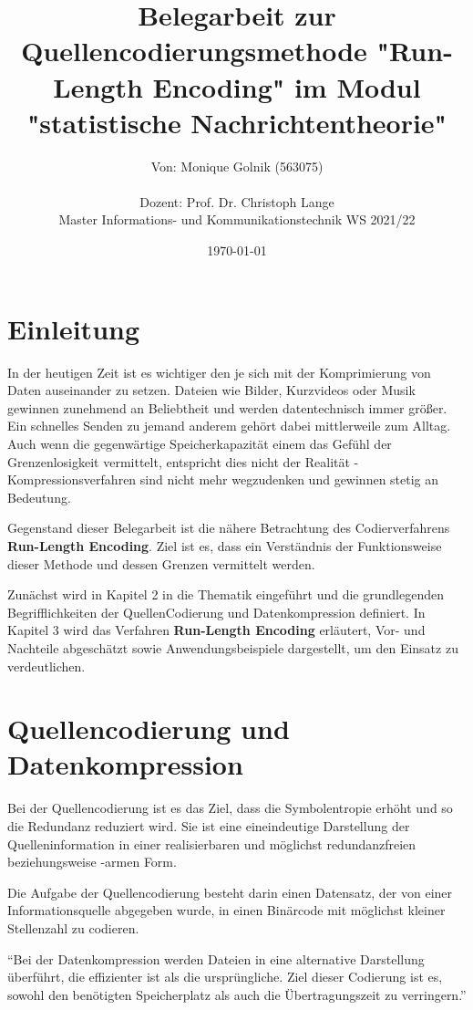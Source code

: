 \documentclass[11pt,a4paper,ngerman]{report}
\date{\today}
\title{Belegarbeit zur Quellencodierungsmethode \textbf{"Run-Length Encoding"} im Modul "statistische Nachrichtentheorie"}
\author{Von: Monique Golnik (563075) \\ \\Dozent: Prof. Dr. Christoph Lange \\Master Informations- und Kommunikationstechnik WS 2021/22}
\begin{document}
	\maketitle
	\tableofcontents

	\chapter{Einleitung}
	In der heutigen Zeit ist es wichtiger den je sich mit der Komprimierung von Daten auseinander zu setzen. Dateien wie Bilder, Kurzvideos  oder Musik gewinnen zunehmend an Beliebtheit und werden datentechnisch immer größer. Ein schnelles Senden zu jemand anderem gehört dabei mittlerweile zum Alltag.  Auch wenn die gegenwärtige Speicherkapazität einem das Gefühl der Grenzenlosigkeit vermittelt, entspricht dies nicht der Realität - Kompressionsverfahren sind nicht mehr wegzudenken und gewinnen stetig an Bedeutung.  
	
	Gegenstand dieser Belegarbeit ist die nähere Betrachtung des Codierverfahrens \textbf{Run-Length Encoding}.
	Ziel ist es, dass ein Verständnis der Funktionsweise dieser Methode und dessen Grenzen vermittelt werden.
    
	Zunächst wird in Kapitel 2  in die Thematik  eingeführt und die grundlegenden Begrifflichkeiten der QuellenCodierung und Datenkompression definiert. In Kapitel 3 wird das Verfahren \textbf{Run-Length Encoding} erläutert, Vor- und Nachteile abgeschätzt sowie Anwendungsbeispiele dargestellt, um den Einsatz zu verdeutlichen.



	\chapter{Quellencodierung und Datenkompression}
	
		Bei der Quellencodierung ist es das Ziel, dass die Symbolentropie erhöht und so die Redundanz reduziert wird. Sie ist eine eineindeutige Darstellung der Quelleninformation in einer realisierbaren und möglichst redundanzfreien beziehungsweise -armen Form.
		
		Die Aufgabe der Quellencodierung besteht darin einen Datensatz, der von einer Informationsquelle abgegeben wurde, in einen Binärcode mit möglichst kleiner Stellenzahl zu codieren. \cite[Seite 47 ff.]{Lange2021}
	     
	    \enquote{Bei der Datenkompression werden Dateien in eine alternative Darstellung überführt, die effizienter ist als die ursprüngliche. Ziel dieser Codierung ist es, sowohl den benötigten Speicherplatz als auch die Übertragungszeit zu verringern.} \cite{IONOS} 
	
\end{document}
